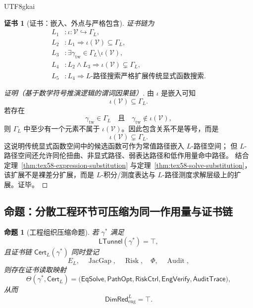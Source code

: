 \documentclass[12pt]{article}
\newtheorem{proposition}{命题}[section]
\newtheorem{Certificate}{证书}[section]
\newcommand{\Vcal}{\mathcal V}
\DeclareMathOperator{\Audit}{Audit}
\DeclareMathOperator{\JacGap}{JacGap}
\DeclareMathOperator{\Risk}{Risk}
\begin{document}
\begin{CJK*}{UTF8}{gkai}
\begin{Certificate}[证书：嵌入、外点与严格包含]
\label{cert:tex58-l-path-search-expansion}
证书链为
\[
\begin{aligned}
  L_1 &: \iota:\Vcal\hookrightarrow\Gamma_L,\\
  L_2 &: L_1\Rightarrow \iota(\Vcal)\subseteq\Gamma_L,\\
  L_3 &: \exists\gamma_{\mathrm{tw}}\in\Gamma_L\setminus\iota(\Vcal),\\
  L_4 &: L_2\wedge L_3\Rightarrow \iota(\Vcal)\subsetneq\Gamma_L,\\
  L_5 &: L_4\Rightarrow
         \text{\(L\)-路径搜索严格扩展传统显式函数搜索}.
\end{aligned}
\]
\end{Certificate}

\begin{proof}[证明（基于数学符号推演逻辑的谓词因果链）]
由 \(\iota\) 是嵌入可知
\[
  \iota(\Vcal)\subseteq\Gamma_L.
\]
若存在
\[
  \gamma_{\mathrm{tw}}\in\Gamma_L
  \quad\text{且}\quad
  \gamma_{\mathrm{tw}}\notin\iota(\Vcal),
\]
则 \(\Gamma_L\) 中至少有一个元素不属于 \(\iota(\Vcal)\)。因此包含关系不是等号，而是
\[
  \iota(\Vcal)\subsetneq\Gamma_L.
\]
这说明传统显式函数空间中的候选函数可作为常值路径嵌入 \(L\)-路径空间；
但 \(L\)-路径空间还允许同伦扭曲、非显式路径、弱表达路径和低作用量命中路径。
结合定理~\ref{thm:tex58-expression-substitution} 与定理~\ref{thm:tex58-solve-substitution}，
该扩展不是裸差分扩展，而是 \(L\)-积分/测度表达与 \(L\)-路径测度求解层级上的扩展。证毕。
\end{proof}

\subsection[命题：作用量与证书链压缩工程环节]{命题：分散工程环节可压缩为同一作用量与证书链}
\label{subsec:tex58-engineering-compression-proposition}

\begin{proposition}[工程组织压缩命题]
\label{prop:tex58-engineering-compression}
若 \(\gamma^\ast\) 满足
\[
  \mathsf{LTunnel}(\gamma^\ast)=\top,
\]
且证书链 \(\mathsf{Cert}_L(\gamma^\ast)\) 同时登记
\[
  E_L,\quad
  \JacGap,\quad
  \Risk,\quad
  \Phi,\quad
  \Audit,
\]
则存在证书读取映射
\[
  \Theta(\gamma^\ast,\mathsf{Cert}_L)
  =
  \bigl(
  \mathsf{EqSolve},
  \mathsf{PathOpt},
  \mathsf{RiskCtrl},
  \mathsf{EngVerify},
  \mathsf{AuditTrace}
  \bigr),
\]
从而
\[
  \mathsf{DimRed}_{\mathrm{eng}}^L=\top.
\]
\end{proposition}


\end{CJK*}
\end{document}
